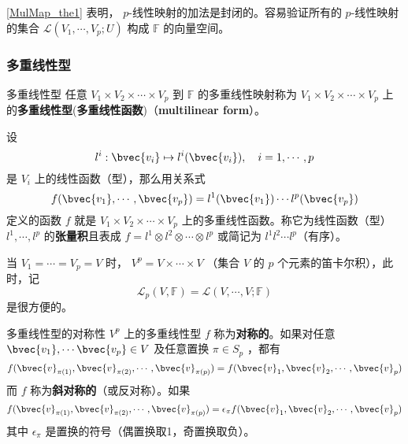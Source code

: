 \autoref{MulMap_the1} 表明， $p$-线性映射的加法是封闭的。容易验证所有的 $p$-线性映射的集合 $\mathcal{L}(V_1,\cdots,V_p;U)$ 构成 $\mathbb{F}$ 的向量空间。
\subsubsection{多重线性型}
\begin{definition}{多重线性型}\label{MulMap_def2}
任意 $V_1\times V_2\times\cdots\times V_p$ 到 $\mathbb{F}$ 的多重线性映射称为 $V_1\times V_2\times\cdots\times V_p$ 上的\textbf{多重线性型}(\textbf{多重线性函数})（\textbf{multilinear form}）。
\end{definition}
\begin{example}{}
设
\begin{equation}
l^i:\bvec{v_i}\mapsto l^i(\bvec{v_i}),\quad i=1,\cdots,p
\end{equation}
是 $V_i$ 上的线性函数（型），那么用关系式
\begin{equation}
f(\bvec{v_1},\cdots,\bvec{v_p})=l^1(\bvec{v_1})\cdots l^p(\bvec{v_p})
\end{equation}
定义的函数 $f$ 就是 $V_1\times V_2\times\cdots\times V_p$ 上的多重线性函数。称它为线性函数（型）$l^1,\cdots,l^p$ 的\textbf{张量积}且表成 $f=l^1\otimes l^2\otimes\cdots\otimes l^p$ 或简记为 $l^1l^2\cdots l^p$（有序）。
\end{example}
当 $V_1=\cdots=V_p=V$ 时， $V^p=V\times\cdots\times V$ （集合 $V$ 的 $p$ 个元素的笛卡尔积），此时，记
\begin{equation}
\mathcal{L}_p(V,\mathbb{F})=\mathcal{L}(V,\cdots,V;\mathbb{F})
\end{equation}
是很方便的。
\begin{definition}{多重线性型的对称性}\label{MulMap_def1}
$V^p$ 上的多重线性型 $f$ 称为\textbf{对称的}。如果对任意 $\bvec{v_1},\cdots\bvec{v_p}\in V$ 及任意置换 $\pi\in S_p$ ，都有
\begin{equation}
f(\bvec{v}_{\pi(1)},\bvec{v}_{\pi(2)},\cdots,\bvec{v}_{\pi(p)})=f(\bvec{v}_1,\bvec{v}_2,\cdots,\bvec{v}_p)
\end{equation}
而 $f$ 称为\textbf{斜对称的}（或反对称）。如果
\begin{equation}
f(\bvec{v}_{\pi(1)},\bvec{v}_{\pi(2)},\cdots,\bvec{v}_{\pi(p)})=\epsilon_\pi f(\bvec{v}_1,\bvec{v}_2,\cdots,\bvec{v}_p)
\end{equation}
其中 $\epsilon_\pi$ 是置换的符号（偶置换取1，奇置换取负）。
\end{definition}